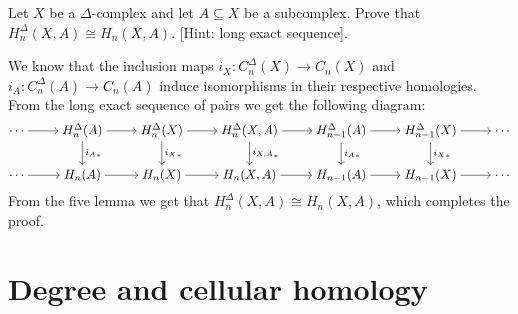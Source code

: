 \documentclass[11pt,a4paper]{article}
\begin{document}
\begin{exercise}
  Let $X$ be a $\Delta$-complex
  and let $A \subseteq X$ be a subcomplex.
  Prove that $H_{n}^{\Delta}(X,A) \cong H_n(X,A)$.
  [Hint: long exact sequence].
\end{exercise}
\begin{solution}
  We know that the inclusion maps
  $i_X \colon C^{\Delta}_n(X) \to C_n(X)$
  and $i_A \colon C^{\Delta}_n(A) \to C_n(A)$
  induce isomorphisms in their respective homologies.
  From the long exact sequence of pairs we get the following
  diagram:
  \[\begin{tikzcd}[ampersand replacement=\&,cramped]
    \cdots \& {H_n^{\Delta}(A)} \& {H_n^{\Delta}(X)} \& {H_n^{\Delta}(X,A)} \& {H_{n-1}^{\Delta}(A)} \& {H_{n-1}^{\Delta}(X)} \& \cdots \\
    \cdots \& {H_n(A)} \& {H_n(X)} \& {H_n(X,A)} \& {H_{n-1}(A)} \& {H_{n-1}(X)} \& \cdots
    \arrow[from=1-1, to=1-2]
    \arrow[from=1-2, to=1-3]
    \arrow["{{i_A}_*}", from=1-2, to=2-2]
    \arrow[from=1-3, to=1-4]
    \arrow["{{i_X}_*}", from=1-3, to=2-3]
    \arrow[from=1-4, to=1-5]
    \arrow["{{i_{X,A}}_*}", from=1-4, to=2-4]
    \arrow[from=1-5, to=1-6]
    \arrow["{{i_A}_*}", from=1-5, to=2-5]
    \arrow[from=1-6, to=1-7]
    \arrow["{{i_X}_*}", from=1-6, to=2-6]
    \arrow[from=2-1, to=2-2]
    \arrow[from=2-2, to=2-3]
    \arrow[from=2-3, to=2-4]
    \arrow[from=2-4, to=2-5]
    \arrow[from=2-5, to=2-6]
    \arrow[from=2-6, to=2-7]
  \end{tikzcd}\]
  From the five lemma we get that $H_n^{\Delta}(X,A) \cong H_n(X,A)$,
  which completes the proof.
\end{solution}


\section{Degree and cellular homology}
\end{document}

